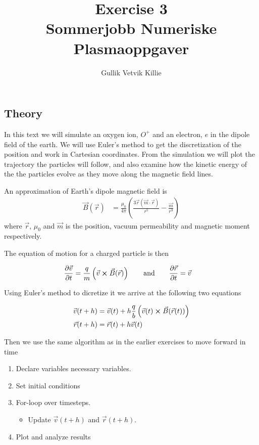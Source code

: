 \documentclass[x11names]{article}
\title{ Exercise 3 \\ Sommerjobb Numeriske Plasmaoppgaver }
\author{Gullik Vetvik Killie
		}
\renewcommand{\va}{\vec}
\begin{document}
\maketitle

\section{}

\subsection{Theory}

In this text we will simulate an oxygen ion, \(O^+\) and an electron, \(e\) in the dipole field of the earth. We will use Euler's method to get the discretization of the position and work in Cartesian coordinates. From the simulation we will plot the trajectory the particles will follow, and also examine how the kinetic energy of the the particles evolve as they move along the magnetic field lines.

An approximation of Earth's dipole magnetic field is
\begin{align}
      \va{B}(\va{r}) &= \frac{\mu_0}{4\pi}\left(\frac{3\va{r}\left( \va{m} \cdot \va{r}\right)}{r^5} - \frac{\va{m}}{r^3}\right)
\end{align}
where \( \va{r} \), \(\mu_0\) and \(\va{m}\) is the position, vacuum permeability and magnetic moment respectively.

The equation of motion for a charged particle is then

\begin{align}
      \pdv{\va{v}}{t} &= \frac{q}{m}\left( \va{v} \cross \va{B}(\va{r}) \right)
      \qquad{\text{and}} \qquad
      \pdv{\va{r}}{t} = \va{v}  \label{eq:EoM}
\end{align}

Using Euler's method to dicretize it we arrive at the following two equations

\begin{align}
      \va{v}(t+h) &= \va{v}(t) + h\frac{q}{b} \left( \va{v}(t) \cross \va{B}(\va{r}(t)) \right)
      \\
      \va{r}(t+h) &= \va{r}(t) + h \va{v}(t)
\end{align}

Then we use the same algorithm as in the earlier exercises to move forward in time

 \begin{enumerate}
            \item Declare variables necessary variables.
            \item Set initial conditions
            \item For-loop over timesteps. 
                  \begin{itemize}
                        \item Update \( \va{v}(t+h) \) and \( \va{r}( t+h ) \).
                  \end{itemize}
            \item Plot and analyze results
\end{enumerate}
\end{document}
